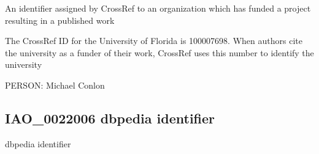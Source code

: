 \documentclass[letterpaper,10pt,english]{sphinxmanual}
\begin{document}
\begin{sphinxShadowBox}

\sphinxAtStartPar
An identifier assigned by CrossRef to an organization which has funded a project resulting in a published work
\end{sphinxShadowBox}

\begin{sphinxShadowBox}

\sphinxAtStartPar
The CrossRef ID for the University of Florida is 100007698.  When authors cite the university as a funder of their work, CrossRef uses this number to identify the university
\end{sphinxShadowBox}

\begin{sphinxShadowBox}

\sphinxAtStartPar
{}
\end{sphinxShadowBox}

\begin{sphinxShadowBox}

\sphinxAtStartPar
PERSON: Michael Conlon
\end{sphinxShadowBox}
\begin{quote}

\ignorespaces \end{quote}


\subsection{IAO\_0022006 \sphinxhyphen{} dbpedia identifier}
\label{\detokenize{doc-IAO_0022006:iao-0022006-dbpedia-identifier}}\label{\detokenize{doc-IAO_0022006:index-0}}\label{\detokenize{doc-IAO_0022006::doc}}
\begin{sphinxShadowBox}

\sphinxAtStartPar
dbpedia identifier
\end{sphinxShadowBox}

\begin{sphinxShadowBox}

\sphinxAtStartPar
{\hyperref[\detokenize{doc-IAO_0000578::doc}]{}}
\end{sphinxShadowBox}
\end{document}
